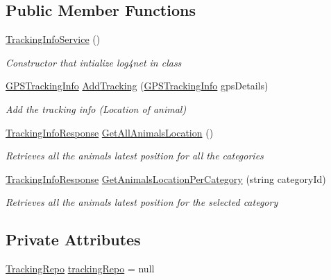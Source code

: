 \subsection*{Public Member Functions}
\begin{DoxyCompactItemize}
\item 
\hyperlink{classWildLifeTracker_1_1Services_1_1TrackingInfoService_ac3cacf8f797148311595b1403308b6cf}{Tracking\+Info\+Service} ()
\begin{DoxyCompactList}\small\item\em Constructor that intialize log4net in class \end{DoxyCompactList}\item 
\hyperlink{classWildLifeTracker_1_1Models_1_1GPSTrackingInfo}{G\+P\+S\+Tracking\+Info} \hyperlink{classWildLifeTracker_1_1Services_1_1TrackingInfoService_a25bb0b990b8fd5649a97a10d14faecd2}{Add\+Tracking} (\hyperlink{classWildLifeTracker_1_1Models_1_1GPSTrackingInfo}{G\+P\+S\+Tracking\+Info} gps\+Details)
\begin{DoxyCompactList}\small\item\em Add the tracking info (Location of animal) \end{DoxyCompactList}\item 
\hyperlink{classWildLifeTracker_1_1Response_1_1TrackingInfoResponse}{Tracking\+Info\+Response} \hyperlink{classWildLifeTracker_1_1Services_1_1TrackingInfoService_a858073f81f74fcdf93b69fe464b13e84}{Get\+All\+Animals\+Location} ()
\begin{DoxyCompactList}\small\item\em Retrieves all the animal\textquotesingle{}s latest position for all the categories \end{DoxyCompactList}\item 
\hyperlink{classWildLifeTracker_1_1Response_1_1TrackingInfoResponse}{Tracking\+Info\+Response} \hyperlink{classWildLifeTracker_1_1Services_1_1TrackingInfoService_af4b4cf67d3e3a8ec3e01041262c8f13a}{Get\+Animals\+Location\+Per\+Category} (string category\+Id)
\begin{DoxyCompactList}\small\item\em Retrieves all the animal\textquotesingle{}s latest position for the selected category \end{DoxyCompactList}\end{DoxyCompactItemize}
\subsection*{Private Attributes}
\begin{DoxyCompactItemize}
\item 
\hyperlink{classWildLifeTracker_1_1Repository_1_1TrackingRepo}{Tracking\+Repo} \hyperlink{classWildLifeTracker_1_1Services_1_1TrackingInfoService_a06c9afa34640dfb7799f60c2bf14f821}{tracking\+Repo} = null
\end{DoxyCompactItemize}


